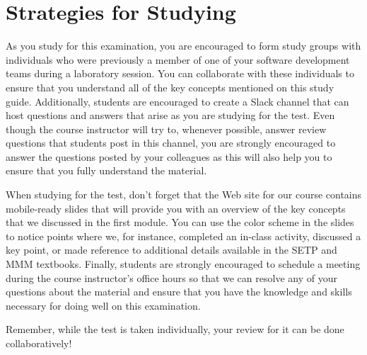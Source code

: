 \vspace*{-.15in}
\section*{Strategies for Studying}
\vspace*{-.05in}

As you study for this examination, you are encouraged to form study groups with individuals who were previously a
member of one of your software development teams during a laboratory session. You can collaborate with these individuals
to ensure that you understand all of the key concepts mentioned on this study guide. Additionally, students are
encouraged to create a Slack channel that can host questions and answers that arise as you are studying for the test.
Even though the course instructor will try to, whenever possible, answer review questions that students post in this
channel, you are strongly encouraged to answer the questions posted by your colleagues as this will also help you to
ensure that you fully understand the material.

When studying for the test, don't forget that the Web site for our course contains mobile-ready slides that will provide
you with an overview of the key concepts that we discussed in the first module. You can use the color scheme in the
slides to notice points where we, for instance, completed an in-class activity, discussed a key point, or made reference
to additional details available in the SETP and MMM textbooks. Finally, students are strongly encouraged to schedule a
meeting during the course instructor's office hours so that we can resolve any of your questions about the material and
ensure that you have the knowledge and skills necessary for doing well on this examination.

Remember, while the test is taken individually, your review for it can be done collaboratively!


